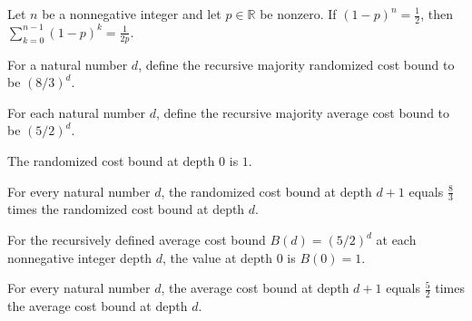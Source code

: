 \begin{theorem}
\label{FABL.orAverageQueryCost_at_critical}
\leanok
{}
Let $n$ be a nonnegative integer and let $p\in\mathbb{R}$ be nonzero. If
$(1-p)^n=\frac12$, then $\sum_{k=0}^{n-1}(1-p)^k=\frac{1}{2p}$.
\end{theorem}

\begin{definition}
\label{FABL.recursiveMajorityRandomizedCostBound}
\leanok
For a natural number $d$, define the recursive majority randomized cost bound to be
$(8/3)^d$.
\end{definition}

\begin{definition}
\label{FABL.recursiveMajorityAverageCostBound}
\leanok
For each natural number $d$, define the recursive majority average cost bound to be
$(5/2)^d$.
\end{definition}

\begin{theorem}
\label{FABL.recursiveMajorityRandomizedCostBound_zero}
\leanok
{}
The randomized cost bound at depth $0$ is $1$.
\end{theorem}

\begin{theorem}
\label{FABL.recursiveMajorityRandomizedCostBound_succ}
\leanok
{}
For every natural number $d$, the randomized cost bound at depth $d+1$ equals
$\frac{8}{3}$ times the randomized cost bound at depth $d$.
\end{theorem}

\begin{theorem}
\label{FABL.recursiveMajorityAverageCostBound_zero}
\leanok
{}
For the recursively defined average cost bound $B(d)=(5/2)^d$ at each nonnegative
integer depth $d$, the value at depth $0$ is $B(0)=1$.
\end{theorem}

\begin{theorem}
\label{FABL.recursiveMajorityAverageCostBound_succ}
\leanok
{}
For every natural number $d$, the average cost bound at depth $d+1$ equals $\frac{5}{2}$
times the average cost bound at depth $d$.
\end{theorem}

